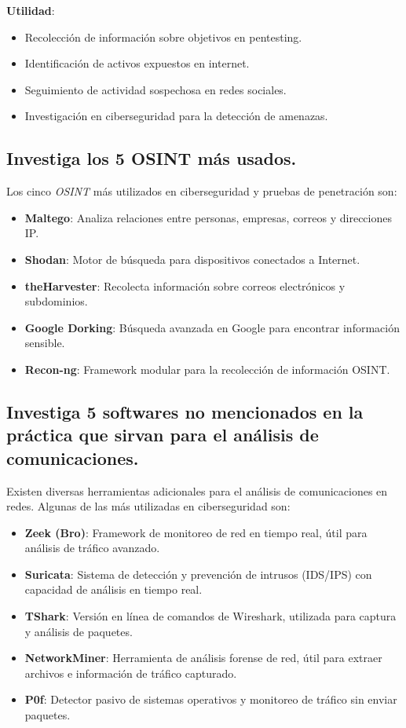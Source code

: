 \textbf{Utilidad}:
\begin{itemize}
    \item Recolección de información sobre objetivos en pentesting.
    \item Identificación de activos expuestos en internet.
    \item Seguimiento de actividad sospechosa en redes sociales.
    \item Investigación en ciberseguridad para la detección de amenazas.
\end{itemize}

\subsection{Investiga los 5 OSINT más usados.}
Los cinco \textit{OSINT} más utilizados en ciberseguridad y pruebas de penetración son:

\begin{itemize}
    \item \textbf{Maltego}: Analiza relaciones entre personas, empresas, correos y direcciones IP.
    \item \textbf{Shodan}: Motor de búsqueda para dispositivos conectados a Internet.
    \item \textbf{theHarvester}: Recolecta información sobre correos electrónicos y subdominios.
    \item \textbf{Google Dorking}: Búsqueda avanzada en Google para encontrar información sensible.
    \item \textbf{Recon-ng}: Framework modular para la recolección de información OSINT.
\end{itemize}

\subsection{Investiga 5 softwares no mencionados en la práctica que sirvan para el análisis de comunicaciones.}
Existen diversas herramientas adicionales para el análisis de comunicaciones en redes. Algunas de las más utilizadas en ciberseguridad son:
\begin{itemize}
    \item \textbf{Zeek (Bro)}: Framework de monitoreo de red en tiempo real, útil para análisis de tráfico avanzado.
    \item \textbf{Suricata}: Sistema de detección y prevención de intrusos (IDS/IPS) con capacidad de análisis en tiempo real.
    \item \textbf{TShark}: Versión en línea de comandos de Wireshark, utilizada para captura y análisis de paquetes.
    \item \textbf{NetworkMiner}: Herramienta de análisis forense de red, útil para extraer archivos e información de tráfico capturado.
    \item \textbf{P0f}: Detector pasivo de sistemas operativos y monitoreo de tráfico sin enviar paquetes.
\end{itemize}

